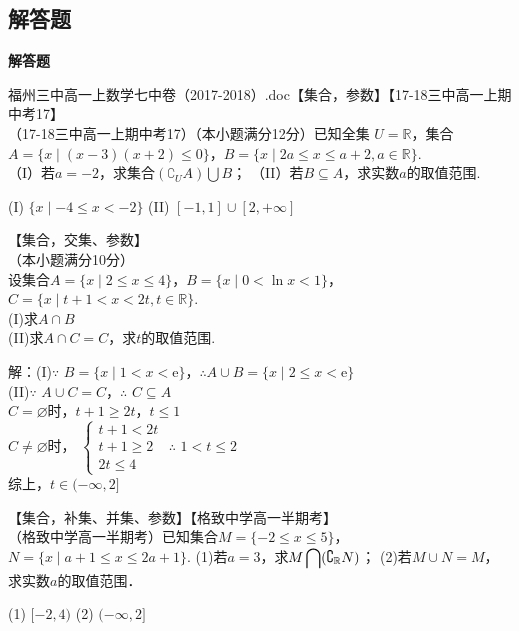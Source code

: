   \subsection{解答题}
  \begin{exercise}{\bf 解答题}
    \item 福州三中高一上数学七中卷（2017-2018）.doc【集合，参数】【17-18三中高一上期中考17】\\
      （17-18三中高一上期中考17）（本小题满分12分）已知全集 $U=\mathbb{R}$，集合$A=\{x\mid (x-3)(x+2)\leq0\} $，$B=\{x\mid 2a\leq x\leq a+2,a\in \mathbb{R} \} $.\\
      （I）若$a=-2 $，求集合$(\complement_UA)\bigcup B $；
      （II）若$B\subseteq A $，求实数$a $的取值范围.
      \begin{answer}
       (I) $\{x\mid -4\leq x<-2 \} $
       (II) $[-1,1]\cup[2,+\infty] $
      \end{answer}
    \item 【集合，交集、参数】\\
      （本小题满分10分）\\
      设集合$A=\{x\mid 2\leq x\leq4\}$，$B=\{x\mid 0<\ln x<1\}$，$C=\{x\mid t+1<x<2t,t\in\mathbb{R}\}$.\\
      (I)求$A\cap B$\\
      (II)求$A\cap C=C$，求$t$的取值范围.\\
      \begin{answer}
      解：(I)$\because$ $B=\{x\mid 1<x<\mathrm{e}\}$，$\therefore$$A\cup B=\{x\mid 2\leq x<\mathrm{e}\}$\\
      (II)$\because$ $A\cup C=C$，$\therefore$ $C\subseteq A$\\
      $C=\varnothing$时，$t+1\geq 2t$，$t\leq 1$\\
      $C\neq\varnothing$时，
      $\begin{cases}
        t+1<2t\\
        t+1\geq 2\\
        2t\leq 4
      \end{cases}
      $
      $\therefore$ $1<t\leq 2$\\
      综上，$t\in (-\infty,2]$
      \end{answer}
    \item 【集合，补集、并集、参数】【格致中学高一半期考】\\
      （格致中学高一半期考）已知集合$M=\{-2\leq x\leq 5\} $，$N=\{x\mid a+1\leq x\leq 2a+1\} $.
      (1)若$a=3 $，求$M\displaystyle \bigcap(\complement_{\mathbb{R} }{\large N}) $；
      (2)若$M\cup N=M $，求实数$a $的取值范围．
      \begin{answer}
        (1) $[-2,4)$
        (2) $(-\infty,2] $
      \end{answer}
  \end{exercise}
